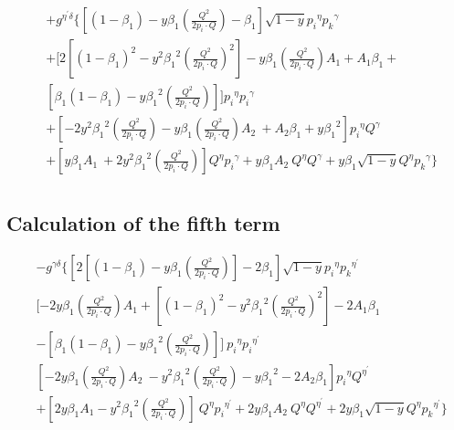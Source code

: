 \begin{equation}
\begin{split} 
&+g^{{{\eta}^{\prime}}{{\delta}}}\lbrace [(1-\beta_1)-y\beta_1 (\frac{Q^2}{2p_i \cdot Q})-\beta_1] \sqrt{1-y}{p_i}^{{\eta}}{{p_k}^{{\gamma}}}\\
&+[2[(1-\beta_1)^2-y^2 {\beta_1}^2 (\frac{Q^2}{2p_i \cdot Q})^2]-y {\beta_1} (\frac{Q^2}{2p_i \cdot Q}) A_1 +A_1\beta_1 +\\
&[\beta_1(1-\beta_1)-y {\beta_1}^2 (\frac{Q^2}{2p_i \cdot Q})]] {p_i}^{{\eta}}{p_i}^{{\gamma}}\\
& +[-2y^2 {\beta_1}^2 (\frac{Q^2}{2p_i \cdot Q})-y {\beta_1} (\frac{Q^2}{2p_i \cdot Q}) A_2\:+A_2\beta_1 +y {\beta_1}^2] {p_i}^{{\eta}}{Q}^{{\gamma}}\\
&+[y {\beta_1} A_1 \:+2y^2 {\beta_1}^2 (\frac{Q^2}{2p_i \cdot Q})]{Q}^{{\eta}}{p_i}^{{\gamma}}+y {\beta_1} A_2 \:{Q}^{{\eta}}{Q}^{{\gamma}}+y {\beta_1}\sqrt{1-y}{Q}^{{\eta}}{{p_k}^{{\gamma}}}
\rbrace\\
\end{split}
\end{equation}

\subsection*{Calculation of the fifth term}

\begin{equation}
\begin{split} 
&-g^{{{\gamma}}{{\delta}}}\lbrace[2[(1-\beta_1)-y\beta_1 (\frac{Q^2}{2p_i \cdot Q})]-2\beta_1] \sqrt{1-y}{p_i}^{{\eta}}{{p_k}^{{\eta}^{\prime}}}\\
&[-2y {\beta_1} (\frac{Q^2}{2p_i \cdot Q}) A_1+[(1-\beta_1)^2-y^2 {\beta_1}^2 (\frac{Q^2}{2p_i \cdot Q})^2]-2A_1\beta_1\\
&-[\beta_1(1-\beta_1)-y {\beta_1}^2 (\frac{Q^2}{2p_i \cdot Q})] ]\:{p_i}^{{\eta}}{p_i}^{{\eta}^{\prime}}\\
&[-2y {\beta_1} (\frac{Q^2}{2p_i \cdot Q}) A_2\: -y^2 {\beta_1}^2 (\frac{Q^2}{2p_i \cdot Q})-y {\beta_1}^2 -2A_2\beta_1 ]{p_i}^{{\eta}}{Q}^{{\eta}^{\prime}}\\
&+[2y {\beta_1} A_1-y^2 {\beta_1}^2 (\frac{Q^2}{2p_i \cdot Q})] \:{Q}^{{\eta}}{p_i}^{{\eta}^{\prime}}+2y {\beta_1} A_2 \:{Q}^{{\eta}}{Q}^{{\eta}^{\prime}}+2y {\beta_1}\sqrt{1-y}{Q}^{{\eta}}{{p_k}^{{\eta}^{\prime}}}\rbrace\\
\end{split}
\end{equation}

